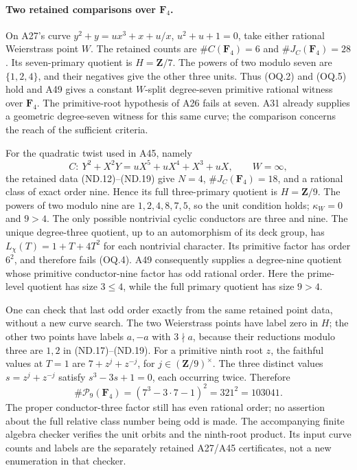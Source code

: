 \paragraph{Two retained comparisons over $\mathbf F_4$.}
On A27's curve
$y^2+y=ux^3+x+u/x$, $u^2+u+1=0$, take either rational
Weierstrass point $W$. The retained counts are
$\#C(\mathbf F_4)=6$ and $\#J_C(\mathbf F_4)=28$.
Its seven-primary quotient is $H=\mathbf Z/7$.
The powers of two modulo seven are $\{1,2,4\}$, and their
negatives give the other three units. Thus (OQ.2) and (OQ.5)
hold and A49 gives a constant $W$-split degree-seven primitive
rational witness over $\mathbf F_4$. The primitive-root
hypothesis of A26 fails at seven. A31 already supplies a
geometric degree-seven witness for this same curve; the
comparison concerns the reach of the sufficient criteria.

For the quadratic twist used in A45, namely
\[
          C:\ Y^2+X^2Y=uX^5+uX^4+X^3+uX,
                     \qquad W=\infty,
 \tag{OQ.14}
\]
the retained data (ND.12)--(ND.19) give $N=4$,
$\#J_C(\mathbf F_4)=18$, and a rational class of exact
order nine. Hence its full three-primary quotient is
$H=\mathbf Z/9$. The powers of two modulo nine are
$1,2,4,8,7,5$, so the unit condition holds; $\kappa_W=0$
and $9>4$. The only possible nontrivial cyclic conductors
are three and nine. The unique degree-three quotient,
up to an automorphism of its deck group, has
$L_\chi(T)=1+T+4T^2$ for each nontrivial character.
Its primitive factor has order $6^2$, and therefore fails
(OQ.4). A49 consequently supplies a degree-nine quotient
whose primitive conductor-nine factor has odd rational order.
Here the prime-level quotient has size $3\le4$, while the
full primary quotient has size $9>4$.

One can check that last odd order exactly from the same retained
point data, without a new curve search. The two Weierstrass
points have label zero in $H$; the other two points have labels
$a,-a$ with $3\nmid a$, because their reductions modulo three
are $1,2$ in (ND.17)--(ND.19). For a primitive ninth root $z$,
the faithful values at $T=1$ are $7+z^j+z^{-j}$, for
$j\in(\mathbf Z/9)^\times$. The three distinct values
$s=z^j+z^{-j}$ satisfy $s^3-3s+1=0$, each occurring twice.
Therefore
\[
 \#\mathcal P_9(\mathbf F_4)
     =\left(7^3-3\cdot7-1\right)^2
     =321^2=103041.
 \tag{OQ.15}
\]
The proper conductor-three factor still has even rational order;
no assertion about the full relative class number being odd
is made. The accompanying finite algebra checker verifies the
unit orbits and the ninth-root product. Its input curve counts
and labels are the separately retained A27/A45 certificates,
not a new enumeration in that checker.

